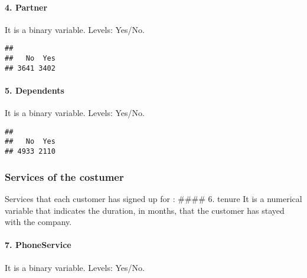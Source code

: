 \documentclass[
]{article}
\newenvironment{Shaded}{\begin{snugshade}}{\end{snugshade}}
\newcommand{\FunctionTok}[1]{\textcolor[rgb]{0.00,0.00,0.00}{#1}}
\newcommand{\NormalTok}[1]{#1}
\newcommand{\SpecialCharTok}[1]{\textcolor[rgb]{0.00,0.00,0.00}{#1}}
\begin{document}
\hypertarget{partner}{%
\paragraph{4. Partner}\label{partner}}

It is a binary variable. Levels: Yes/No.~

\begin{Shaded}
\end{Shaded}

\begin{verbatim}
## 
##   No  Yes 
## 3641 3402
\end{verbatim}

\hypertarget{dependents}{%
\paragraph{5. Dependents}\label{dependents}}

It is a binary variable. Levels: Yes/No.~

\begin{Shaded}
\end{Shaded}

\begin{verbatim}
## 
##   No  Yes 
## 4933 2110
\end{verbatim}

\hypertarget{services-of-the-costumer}{%
\subsubsection{Services of the
costumer}\label{services-of-the-costumer}}

Services that each customer has signed up for : \#\#\#\# 6. tenure It is
a numerical variable that indicates the duration, in months, that the
customer has stayed with the company.

\hypertarget{phoneservice}{%
\paragraph{7. PhoneService}\label{phoneservice}}

It is a binary variable. Levels: Yes/No.~
\end{document}
